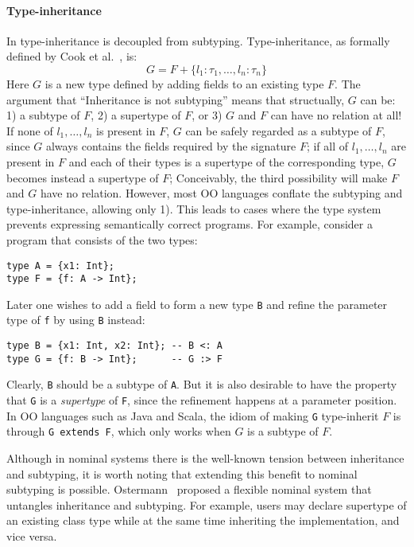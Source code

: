 \paragraph{Type-inheritance} In \name type-inheritance is decoupled
from subtyping. Type-inheritance, as formally defined by Cook et
al.~\cite{cook1989inheritance}, is:
\[
G = F + \{ l_1:\tau_1, \ldots, l_n:\tau_n \}
\]
Here $G$ is a new type defined by adding fields to an existing type $F$.
The argument that ``Inheritance is not subtyping'' means that structually, $G$ can
be: 1) a subtype of $F$, 2) a supertype of $F$, or 3) $G$ and $F$ can have no
relation at all! If none of $l_1, \ldots, l_n$ is present in $F$, $G$ can be
safely regarded as a subtype of $F$, since $G$ always contains the fields
required by the signature $F$; if all of $l_1, \ldots, l_n$ are present in $F$
and each of their types is a supertype of the corresponding type, $G$ becomes
instead a supertype of $F$; Conceivably, the third possibility will make $F$ and
$G$ have no relation. However, most OO languages conflate the
subtyping and type-inheritance, allowing only 1). This leads
to cases where the type system prevents expressing semantically
correct programs. For example, consider a program that consists of the two
types:
\begin{lstlisting}
type A = {x1: Int};
type F = {f: A -> Int};
\end{lstlisting}
Later one wishes to add a field to form a new type \lstinline$B$ and refine the
parameter type of \lstinline$f$ by using \lstinline$B$ instead:
\begin{lstlisting}
type B = {x1: Int, x2: Int}; -- B <: A
type G = {f: B -> Int};      -- G :> F
\end{lstlisting}
Clearly, \lstinline$B$ should be a subtype of \lstinline$A$. But it is also
desirable to have the property that \lstinline$G$ is a \emph{supertype} of
\lstinline$F$, since the refinement happens at a parameter position. In OO
languages such as Java and Scala, the idiom of making \lstinline$G$ type-inherit
$F$ is through \lstinline$G extends F$, which only works when $G$ is a
subtype of $F$.

Although in nominal systems there is the well-known tension between inheritance
and subtyping, it is worth noting that extending this benefit to nominal
subtyping is possible. Ostermann~\cite{ostermann2008nominal} proposed a flexible
nominal system that untangles inheritance and subtyping. For example, users may
declare supertype of an existing class type while at the same time inheriting
the implementation, and vice versa.

